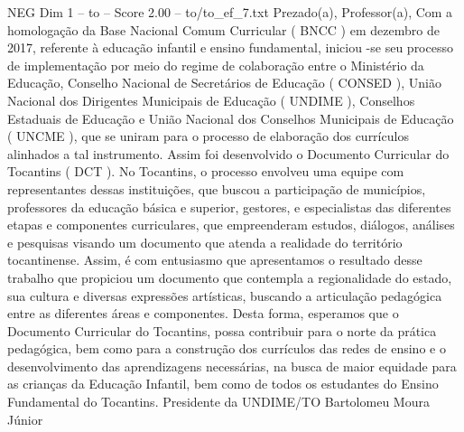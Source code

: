 \begin{textsample}{NEG Dim 1 – to – Score 2.00 – to/to\_ef\_7.txt}  \label{ex:f1_neg_033}
Prezado(a), Professor(a), Com a homologação da Base Nacional Comum Curricular ( BNCC ) em dezembro de 2017, referente à educação infantil e ensino fundamental, iniciou -se seu processo de implementação por meio do regime de colaboração entre o Ministério da Educação, Conselho Nacional de Secretários de Educação ( CONSED ), União Nacional dos Dirigentes Municipais de Educação ( UNDIME ), Conselhos Estaduais de Educação e União Nacional dos Conselhos Municipais de Educação ( UNCME ), que se uniram para o processo de elaboração dos currículos alinhados a tal instrumento.
Assim foi desenvolvido o Documento Curricular do Tocantins ( DCT ).
No Tocantins, o processo envolveu uma equipe com representantes dessas instituições, que buscou a participação de municípios, professores da educação básica e superior, gestores, e especialistas das diferentes etapas e componentes curriculares, que empreenderam estudos, diálogos, análises e pesquisas visando um documento que atenda a realidade do território tocantinense.
Assim, é com entusiasmo que apresentamos o resultado desse trabalho que propiciou um documento que contempla a regionalidade do estado, sua cultura e diversas expressões artísticas, buscando a articulação pedagógica entre as diferentes áreas e componentes.
Desta forma, esperamos que o Documento Curricular do Tocantins, possa contribuir para o norte da prática pedagógica, bem como para a construção dos currículos das redes de ensino e o desenvolvimento das aprendizagens necessárias, na busca de maior equidade para as crianças da Educação Infantil, bem como de todos os estudantes do Ensino Fundamental do Tocantins.
Presidente da UNDIME/TO Bartolomeu Moura Júnior

\end{textsample}
